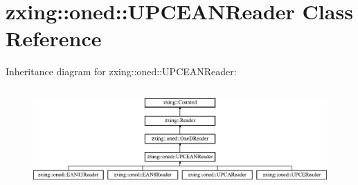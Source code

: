 \hypertarget{classzxing_1_1oned_1_1_u_p_c_e_a_n_reader}{}\section{zxing\+:\+:oned\+:\+:U\+P\+C\+E\+A\+N\+Reader Class Reference}
\label{classzxing_1_1oned_1_1_u_p_c_e_a_n_reader}
Inheritance diagram for zxing\+:\+:oned\+:\+:U\+P\+C\+E\+A\+N\+Reader\+:\begin{figure}[H]
\begin{center}
\leavevmode
\includegraphics[height=3.867403cm]{classzxing_1_1oned_1_1_u_p_c_e_a_n_reader}
\end{center}
\end{figure}
